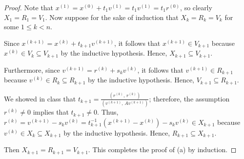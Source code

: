 \documentclass{homework}
\newcommand{\pow}[1]{^{\left(#1\right)}}
\begin{document}
	\begin{proof}
		Note that $x\pow{1} = x\pow{0} + t_1v\pow{1} = t_1v\pow{1} = t_1r\pow{0}$, so clearly $X_1 = R_1 = V_1$. Now suppose for the sake of induction that $X_k = R_k = V_k$ for some $1 \le k < n$.
		
		Since $x\pow{k+1} = x\pow{k} + t_{k+1}v\pow{k+1}$, it follows that $x\pow{k+1} \in V_{k+1}$ because $x\pow{k} \in V_k \subseteq V_{k+1}$ by the inductive hypothesis. Hence, $X_{k+1} \subseteq V_{k+1}$. 
		
		Furthermore, since $v\pow{k+1} = r\pow{k} + s_kv\pow{k}$, it follows that $v\pow{k+1} \in R_{k+1}$ because $v\pow{k} \in R_k \subseteq R_{k+1}$ by the inductive hypothesis. Hence, $V_{k+1} \subseteq R_{k+1}$. 
		
		We showed in class that $t_{k+1} = \frac{\left(r\pow{k},\, r\pow{k}\right)}{\left(v\pow{k+1},\, Av\pow{k+1}\right)}$; therefore, the assumption $r\pow{k} \ne 0$ implies that $t_{k+1} \ne 0$. Thus, $r\pow{k} = v\pow{k+1} - s_kv\pow{k} = t_{k+1}^{-1}\left(x\pow{k+1} -x\pow{k}\right) - s_kv\pow{k} \in X_{k+1}$ because $v\pow{k} \in X_k \subseteq X_{k+1}$ by the inductive hypothesis. Hence, $R_{k+1} \subseteq X_{k+1}$.
		
		Then $X_{k+1} = R_{k+1} = V_{k+1}$. This completes the proof of (a) by induction.
		

\end{proof}
\end{document}
